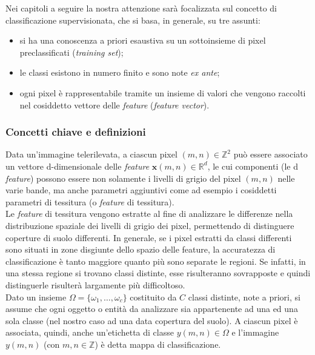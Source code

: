 Nei capitoli a seguire la nostra attenzione sarà focalizzata sul concetto di classificazione supervisionata, che si basa, in generale, su tre assunti:
\begin{itemize}
\item si ha una conoscenza a priori esaustiva su un sottoinsieme di pixel preclassificati (\emph{training set});
\item le classi esistono in numero finito e sono note \emph{ex ante};    
\item ogni pixel è rappresentabile tramite un insieme di valori che vengono raccolti nel cosiddetto vettore delle \emph{feature} (\emph{feature vector}).
\end{itemize}


\subsubsection*{Concetti chiave e definizioni}
Data un'immagine telerilevata, a ciascun pixel $(m,n) \in \mathbb{Z}^2$ può essere associato un vettore d-dimensionale delle \emph{feature} $\textbf{x}(m,n)\in \mathbb{R}^d$, le cui componenti (le d \emph{feature}) possono essere non solamente i livelli di grigio del pixel $(m,n)$ nelle varie bande, ma anche parametri aggiuntivi come ad esempio i cosiddetti parametri di tessitura (o \emph{feature} di tessitura).\\

Le \emph{feature} di tessitura vengono estratte al fine di analizzare le differenze nella distribuzione spaziale dei livelli di grigio dei pixel, permettendo di distinguere coperture di suolo differenti. In generale, se i pixel estratti da classi differenti sono situati in zone disgiunte dello spazio delle feature, la accuratezza di classificazione è tanto maggiore quanto più sono separate le regioni. Se infatti, in una stessa regione si trovano classi distinte, esse risulteranno sovrapposte e quindi distinguerle risulterà largamente più difficoltoso.
\\

Dato un insieme $\Omega =\lbrace\omega_1,\ldots, \omega_c\rbrace$ costituito da $C$ classi distinte, note a priori, si assume che ogni oggetto o entità da analizzare sia appartenente ad una ed una sola classe (nel nostro caso ad una data copertura del suolo). A ciascun pixel è associata, quindi, anche un'etichetta di classe $y(m,n) \in \Omega$ e l'immagine $y(m,n)$ (con $m,n\in \mathbb{Z}$) è detta mappa di classificazione.
\\

